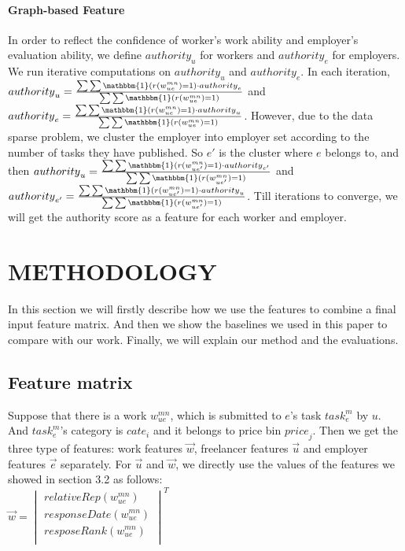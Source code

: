 \paragraph{Graph-based Feature}
In order to reflect the confidence of worker's work ability and employer's evaluation ability, we define ${authority}_{u}$ for workers and ${authority}_{e}$ for employers.  We run iterative computations on ${authority}_{u}$ and ${authority}_{e}$. In each iteration, ${authority}_{u}=\frac{\sum{\sum{\mathbbm{1}(r({w}_{ue}^{mn})=1)}\cdot{authority}_{e}}}{\sum{\sum{\mathbbm{1}(r({w}_{ue}^{mn})=1)}}}$ and ${authority}_{e}=\frac{\sum{\sum{\mathbbm{1}(r({w}_{ue}^{mn})=1)\cdot}{authority}_{u}}}{\sum{\sum{\mathbbm{1}(r({w}_{ue}^{mn})=1)}}}$. However, due to the data sparse problem, we cluster the employer into employer set according to the number of tasks they have published. So $e'$ is the cluster where $e$ belongs to, and then ${authority}_{u}=\frac{\sum{\sum{\mathbbm{1}(r({w}_{ue'}^{mn})=1)}\cdot{authority}_{e'}}}{\sum{\sum{\mathbbm{1}(r({w}_{ue'}^{mn})=1)}}}$ and ${authority}_{e'}=\frac{\sum{\sum{\mathbbm{1}(r({w}_{ue'}^{mn})=1)\cdot}{authority}_{u}}}{\sum{\sum{\mathbbm{1}(r({w}_{ue'}^{mn})=1)}}}$. Till iterations to converge, we will get the authority score as a feature for each worker and employer.


\section{METHODOLOGY}
In this section we will firstly describe how we use the features to combine a final input feature matrix. And then we show the baselines we used in this paper to compare with our work. Finally, we will explain our method and the evaluations.
\subsection{Feature matrix}
Suppose that there is a work ${w}_{ue}^{mn}$, which is submitted to $e$'s task ${task}_{e}^{m}$ by $u$. And ${task}_{e}^{m}$'s category is ${cate}_{i}$ and it belongs to price bin ${price}_{j}$. Then we get the three type of features: work features $\vec{w}$, freelancer features $\vec{u}$ and employer features $\vec{e}$ separately. For $\vec{u}$ and $\vec{w}$, we directly use the values of the features we showed in section 3.2 as follows:\\
$\vec{w}={\begin{vmatrix} 
relativeRep({w}_{ue}^{mn})\\ 
responseDate({w}_{ue}^{mn})\\ 
resposeRank({w}_{ue}^{mn})\\
\end{vmatrix} }^{ T }$

